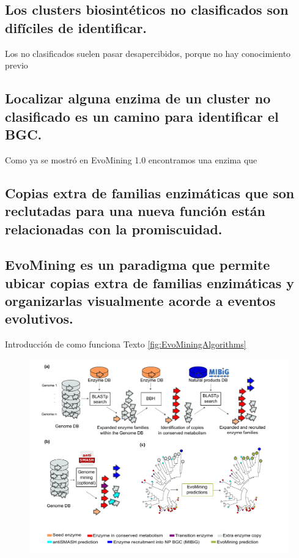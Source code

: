 \documentclass[12pt,twoside]{reedthesis}
\begin{document}
  \subsection{Los clusters biosintéticos no clasificados son difíciles de
  identificar.}\label{los-clusters-biosinteticos-no-clasificados-son-dificiles-de-identificar.}
  
  Los no clasificados suelen pasar desapercibidos, porque no hay
  conocimiento previo
  
  \subsection{Localizar alguna enzima de un cluster no clasificado es un
  camino para identificar el
  BGC.}\label{localizar-alguna-enzima-de-un-cluster-no-clasificado-es-un-camino-para-identificar-el-bgc.}
  
  Como ya se mostró en EvoMining 1.0 encontramos una enzima que
  
  \subsection{Copias extra de familias enzimáticas que son reclutadas para
  una nueva función están relacionadas con la
  promiscuidad.}\label{copias-extra-de-familias-enzimaticas-que-son-reclutadas-para-una-nueva-funcion-estan-relacionadas-con-la-promiscuidad.}
  
  \subsection{EvoMining es un paradigma que permite ubicar copias extra de
  familias enzimáticas y organizarlas visualmente acorde a eventos
  evolutivos.}\label{evomining-es-un-paradigma-que-permite-ubicar-copias-extra-de-familias-enzimaticas-y-organizarlas-visualmente-acorde-a-eventos-evolutivos.}
  
  Introducción de como funciona Texto \autoref{fig:EvoMiningAlgorithms}
  
  \begin{figure}[h!tbp]
  \centering
  \includegraphics[angle = 0,scale = .5]{chapter2/FigurasPaper/Figure1.pdf}
  \caption[EvoMining Algorithm]{\footnotesize{}}
  \label{fig:EvoMiningAlgorithms}
  \end{figure}
  
\end{document}
